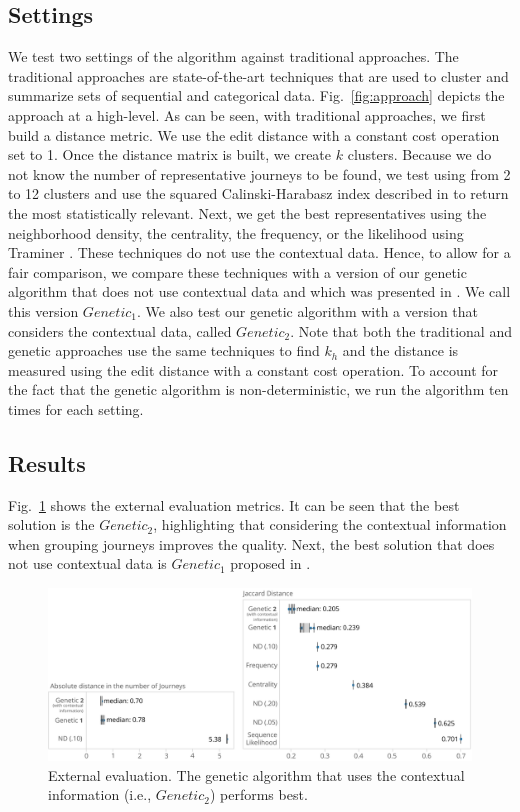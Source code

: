 \documentclass[runningheads]{llncs}
\begin{document}
{{{\subsection{Settings}
We test two settings of the algorithm against traditional approaches. The traditional approaches are state-of-the-art techniques that are used to cluster and summarize sets of sequential and categorical data. Fig.~\ref{fig:approach} depicts the approach at a high-level. As can be seen, with traditional approaches, we first build a distance metric. We use the edit distance with a constant cost operation set to 1. Once the distance matrix is built, we create $k$ clusters. Because we do not know the number of representative journeys to be found, we test using from 2 to 12 clusters and use the squared Calinski-Harabasz index described in \cite{calinski1974dendrite} to return the most statistically relevant. Next, we get the best representatives using the neighborhood density, the centrality, the frequency, or the likelihood using Traminer \cite{gabadinho2013searching}. These techniques do not use the contextual data. Hence, to allow for a fair comparison, we compare these techniques with a version of our genetic algorithm that does not use contextual data and which was presented in \cite{bernard2019genetic}. {We call this version {$Genetic_1$}.} We also test our genetic algorithm with a version that considers the contextual data, called $Genetic_2$. Note that both the traditional and genetic approaches use the same techniques to find $k_{h}$ and the distance is measured using the edit distance with a constant cost operation. To account for the fact that the genetic algorithm is non-deterministic, we run the algorithm ten times for each setting.

\subsection{Results}
Fig.~\ref{fig:results} shows the external evaluation metrics. It can be seen that the best solution is the $Genetic_2$, highlighting that considering the contextual information when grouping journeys improves the quality. Next, the best solution that does not use contextual data is $Genetic_1$ proposed in \cite{bernard2019genetic}. 

\begin{figure}[H]
\centering
\includegraphics[width=1\columnwidth]{05_schema/results_len.pdf}
  \caption{External evaluation. The genetic algorithm that uses the contextual information (i.e., $Genetic_2$) performs best.}
  \label{fig:results}
\end{figure}

}}}
\end{document}
